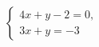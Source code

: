 \begin{ex}
	\begin{condition}
		\( \left\{
		\begin{array}{l}
			4x+y-2=0,\\
			3x+y=-3
		\end{array}
		\right. \)
	\end{condition}
\end{ex}